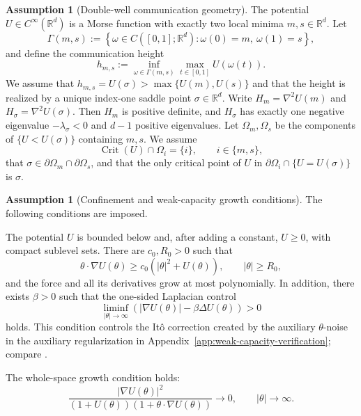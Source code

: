 \documentclass[11pt]{article}
\numberwithin{equation}{section}
\theoremstyle{plain}
\theoremstyle{definition}
\newtheorem{assumption}[theorem]{Assumption}
\theoremstyle{remark}
\newcommand{\R}{\mathbb R}
\begin{document}
\begin{assumption}[Double-well communication geometry]
\label{ass:double-well}
The potential $U\in C^\infty(\R^d)$ is a Morse function with exactly two local
minima $m,s\in\R^d$.  Let
\[
\Gamma(m,s)
:=\left\{\omega\in C([0,1];\R^d):\omega(0)=m,\ \omega(1)=s\right\},
\]
and define the communication height
\[
h_{m,s}:=\inf_{\omega\in\Gamma(m,s)}\max_{t\in[0,1]}U(\omega(t)).
\]
We assume that $h_{m,s}=U(\sigma)>\max\{U(m),U(s)\}$ and that the height is
realized by a unique index-one saddle point $\sigma\in\R^d$.  Write
$H_m=\nabla^2U(m)$ and $H_\sigma=\nabla^2U(\sigma)$.  Then
$H_m$ is positive definite, and $H_\sigma$ has exactly one negative eigenvalue
$-\lambda_\sigma<0$ and $d-1$ positive eigenvalues.  Let
$\Omega_m,\Omega_s$ be the components of $\{U<U(\sigma)\}$ containing $m,s$.
We assume
\[
\operatorname{Crit}(U)\cap\Omega_i=\{i\},
\qquad i\in\{m,s\},
\]
that $\sigma\in\partial\Omega_m\cap\partial\Omega_s$, and that the only
critical point of $U$ in
$\partial\Omega_i\cap\{U=U(\sigma)\}$ is $\sigma$.
\end{assumption}

\begin{assumption}[Confinement and weak-capacity growth conditions]
\label{ass:growth-lyapunov}
The following conditions are imposed.
\begin{description}[leftmargin=3.2em,labelwidth=2.6em]
\item[\textup{(WC1)}] \label{ass:wc-confinement}
The potential $U$ is bounded below and, after adding a constant, $U\ge0$, with
compact sublevel sets.  There are $c_0,R_0>0$ such that
\[
\theta\cdot\nabla U(\theta)
\ge c_0\left(|\theta|^2+U(\theta)\right),
\qquad |\theta|\ge R_0,
\]
and the force and all its derivatives grow at most polynomially.  In addition,
there exists $\beta>0$ such that the one-sided Laplacian control
\[
\liminf_{|\theta|\to\infty}
\left(|\nabla U(\theta)|-\beta\Delta U(\theta)\right)>0
\]
holds.  This condition controls the It\^o correction created by the auxiliary
$\theta$-noise in the auxiliary regularization in Appendix~\ref{app:weak-capacity-verification}; compare
\cite[Assumption~2.3]{LeeRamilSeo2026}.

\item[\textup{(WC2)}] \label{ass:wc-whole-space-growth}
The whole-space growth condition holds:
\[
\frac{|\nabla U(\theta)|^2}
{(1+U(\theta))(1+\theta\cdot\nabla U(\theta))}
\longrightarrow0,
\qquad |\theta|\longrightarrow\infty.
\]
\end{description}
\end{assumption}
\end{document}
